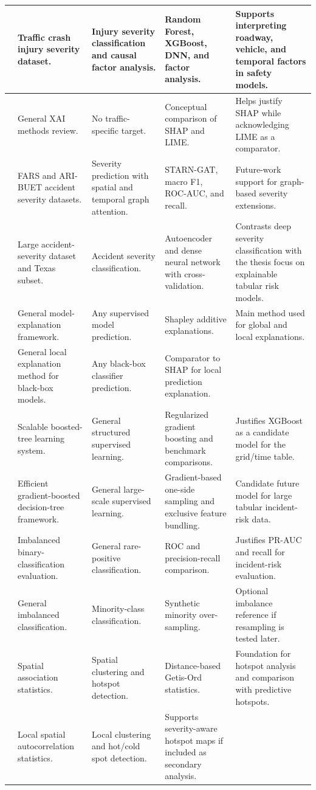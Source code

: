 \begin{longtable}{|p{0.8cm}|p{2.4cm}|p{3.0cm}|p{3.2cm}|p{3.9cm}|}
\cite{chakraborty2021severity} & Traffic crash injury severity dataset. & Injury severity classification and causal factor analysis. & Random Forest, XGBoost, DNN, and factor analysis. & Supports interpreting roadway, vehicle, and temporal factors in safety models. \\ \hline
\cite{salih2023xai} & General XAI methods review. & No traffic-specific target. & Conceptual comparison of SHAP and LIME. & Helps justify SHAP while acknowledging LIME as a comparator. \\ \hline
\cite{nobin2025starn} & FARS and ARI-BUET accident severity datasets. & Severity prediction with spatial and temporal graph attention. & STARN-GAT, macro F1, ROC-AUC, and recall. & Future-work support for graph-based severity extensions. \\ \hline
\cite{bibb2025severity} & Large accident-severity dataset and Texas subset. & Accident severity classification. & Autoencoder and dense neural network with cross-validation. & Contrasts deep severity classification with the thesis focus on explainable tabular risk models. \\ \hline
\cite{lundberg2017shap} & General model-explanation framework. & Any supervised model prediction. & Shapley additive explanations. & Main method used for global and local explanations. \\ \hline
\cite{ribeiro2016lime} & General local explanation method for black-box models. & Any black-box classifier prediction. & Comparator to SHAP for local prediction explanation. \\ \hline
\cite{chen2016xgboost} & Scalable boosted-tree learning system. & General structured supervised learning. & Regularized gradient boosting and benchmark comparisons. & Justifies XGBoost as a candidate model for the grid/time table. \\ \hline
\cite{ke2017lightgbm} & Efficient gradient-boosted decision-tree framework. & General large-scale supervised learning. & Gradient-based one-side sampling and exclusive feature bundling. & Candidate future model for large tabular incident-risk data. \\ \hline
\cite{saito2015prauc} & Imbalanced binary-classification evaluation. & General rare-positive classification. & ROC and precision-recall comparison. & Justifies PR-AUC and recall for incident-risk evaluation. \\ \hline
\cite{chawla2002smote} & General imbalanced classification. & Minority-class classification. & Synthetic minority over-sampling. & Optional imbalance reference if resampling is tested later. \\ \hline
\cite{getis1992distance} & Spatial association statistics. & Spatial clustering and hotspot detection. & Distance-based Getis-Ord statistics. & Foundation for hotspot analysis and comparison with predictive hotspots. \\ \hline
\cite{ord1995local} & Local spatial autocorrelation statistics. & Local clustering and hot/cold spot detection. & Supports severity-aware hotspot maps if included as secondary analysis. \\ \hline
\end{longtable}
\endgroup
